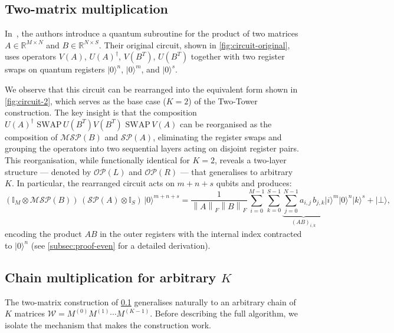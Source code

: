 \documentclass[a4paper,UKenglish,cleveref,autoref,thm-restate]{socg-lipics-v2021}
\providecommand{\ket}[1]{\lvert #1 \rangle}
\newcommand{\norm}[1]{\left\| #1 \right\|}
\newcommand{\SP}{\mathcal{SP}}        %
\newcommand{\MSP}{\mathcal{MSP}} %
\newcommand{\OP}{\mathcal{OP}}        %
\begin{document}
\subsection{Two-matrix multiplication}\label{sec:two_matrix}
In~\cite{bernasconiMatMul}, the authors introduce a quantum
subroutine for the product of two matrices
$A \in \mathbb{R}^{M \times N}$ and $B \in \mathbb{R}^{N \times S}$.
Their original circuit, shown in \cref{fig:circuit-original}, uses
operators $V(A)$, $U(A)^\dagger$, $V(B^T)$, $U(B^T)$ together with
two register swaps on quantum registers $\ket{0}^n$, $\ket{0}^m$, and $\ket{0}^s$.

We observe that this circuit can be rearranged
into the equivalent form shown in \cref{fig:circuit-2}, which serves
as the base case ($K = 2$) of the Two-Tower construction.
The key insight is that the composition
$U(A)^\dagger \, \,\mathrm{SWAP} \, U(B^T)  V(B^T) \, \, 
\mathrm{SWAP}\,  V(A)$ can be reorganised as the composition of 
$\MSP(B)$ and $\SP(A)$, eliminating the register swaps and
grouping the operators into two sequential layers acting on disjoint
register pairs. This reorganisation, while functionally identical for $K = 2$, reveals a two-layer structure --- denoted by $\OP(L)$ and $\OP(R)$ --- that generalises to arbitrary $K$. In particular, the rearranged circuit acts on $m + n + s$ qubits and produces:
\begin{equation*}
 (\mathbb{I}_M \otimes\MSP(B))\,(\SP(A)\otimes \mathbb{I}_S)\,\ket{0}^{m+n+s}
  = \frac{1}{\norm{A}_F\norm{B}_F}
    \sum_{i=0}^{M-1}\sum_{k=0}^{S-1}
    \underbrace{\sum_{j=0}^{N-1} a_{i,j}\,b_{j,k}}_{(AB)_{i,k}}
    \ket{i}^m\ket{0}^n\ket{k}^s + \ket{\bot},
\end{equation*}
encoding the product $AB$ in the outer registers with the internal
index contracted to $\ket{0}^n$ (see \cref{subsec:proof-even} for
a detailed derivation). 




\subsection{Chain multiplication for arbitrary \texorpdfstring{$K$}{K}}\label{sec:chain_mult}

The two-matrix construction of \cref{sec:two_matrix} generalises
naturally to an arbitrary chain of $K$ matrices
$\mathcal{W} = M^{(0)} M^{(1)} \cdots M^{(K-1)}$.
Before describing the full algorithm, we isolate the mechanism that
makes the construction work.
\end{document}

